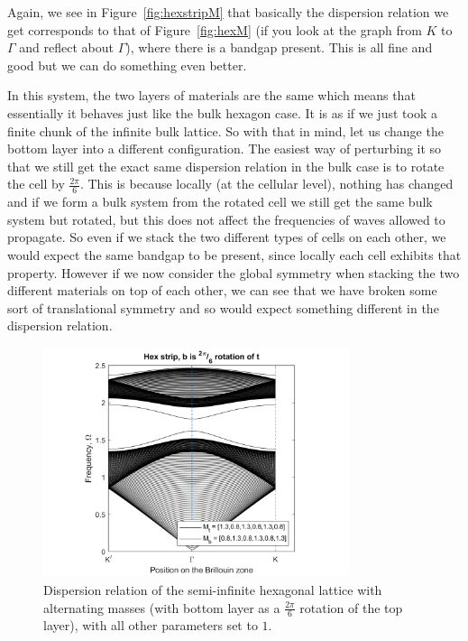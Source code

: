 Again, we see in Figure~\ref{fig:hexstripM} that basically the dispersion
relation we get corresponds to that of Figure~\ref{fig:hexM} (if you look at
the graph from $K$ to $\Gamma$ and reflect about $\Gamma$), where there is a
bandgap present. This is all fine and good but we can do something even better.

In this system, the two layers of materials are the same which means that
essentially it behaves just like the bulk hexagon case. It is as if we just
took a finite chunk of the infinite bulk lattice. So with that in mind, let us
change the bottom layer into a different configuration. The easiest way of
perturbing it so that we still get the exact same dispersion relation in the
bulk case is to rotate the cell by $\frac{2\pi}{6}$. This is because locally
(at the cellular level), nothing has changed and if we form a bulk system from
the rotated cell we still get the same bulk system but rotated, but this does
not affect the frequencies of waves allowed to propagate. So even if we stack
the two different types of cells on each other, we would expect the same
bandgap to be present, since locally each cell exhibits that property. However
if we now consider the global symmetry when stacking the two different
materials on top of each other, we can see that we have broken some sort of
translational symmetry and so would expect something different in the
dispersion relation.

\begin{figure}[!h]
\centering
\includegraphics[width=0.8\textwidth]{imgs/hexstripperturbMrotated.png}
\caption{\label{fig:hexstripMrotated} Dispersion relation of the semi-infinite
  hexagonal lattice with alternating masses (with bottom layer as a
  $\frac{2\pi}{6}$ rotation of the top layer), with all other parameters set to
  $1$.}
\end{figure}

